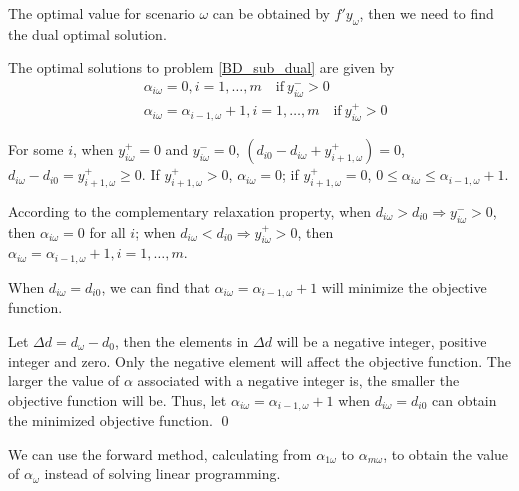 The optimal value for scenario $\omega$ can be obtained by $f{'} y_{\omega}$, then we need to find the dual optimal solution.


\begin{thm}\label{optimal_sol_sub_dual}
  The optimal solutions to problem \eqref{BD_sub_dual} are given by 
\begin{equation}\label{BD_sub_simplified}
  \begin{aligned}
    & \alpha_{i \omega} =0, i =1,\ldots,m \quad \text{if}~  y_{i \omega}^{-} > 0   \\
    & \alpha_{i \omega} = \alpha_{i-1, \omega}+1, i =1,\ldots,m \quad \text{if}~ y_{i \omega}^{+} > 0
  \end{aligned}
\end{equation}
\end{thm}

For some $i$, when $y_{i \omega}^{+} = 0$ and $y_{i \omega}^{-} = 0$, $\left(d_{i 0}- d_{i \omega} + y_{i+1, \omega}^{+}\right) = 0$, $d_{i \omega}- d_{i 0} = y_{i+1, \omega}^{+} \geq 0$.
If $y_{i+1, \omega}^{+} > 0$, $\alpha_{i \omega} = 0$;
if $y_{i+1, \omega}^{+} = 0$, $0 \leq \alpha_{i \omega} \leq \alpha_{i-1, \omega} +1$.

\begin{pf}
  According to the complementary relaxation property, when
$d_{i \omega} > d_{i 0} \Rightarrow y_{i \omega}^{-} >0$, then $\alpha_{i \omega} =0$ for all $i$; when $d_{i \omega} < d_{i 0} \Rightarrow y_{i \omega}^{+} >0$, then $\alpha_{i \omega} = \alpha_{i-1,\omega} +1, i =1,\ldots,m$. 

When $d_{i \omega} = d_{i 0}$,  we can find that $\alpha_{i \omega} = \alpha_{i-1, \omega} + 1$ will minimize the objective function.

Let $\Delta d = d_{\omega} - d_0$, then the elements in $\Delta d$ will be a negative integer, positive integer and zero. 
Only the negative element will affect the objective function.
The larger the value of $\alpha$ associated with a negative integer is, the smaller the objective function will be. Thus, let $\alpha_{i \omega} = \alpha_{i-1, \omega} + 1$ when $d_{i \omega} = d_{i 0}$ can obtain the minimized objective function.
\qed
\end{pf}

We can use the forward method, calculating from $\alpha_{1 \omega}$ to $\alpha_{m \omega}$, to obtain the value of $\alpha_{\omega}$ instead of solving linear programming.

